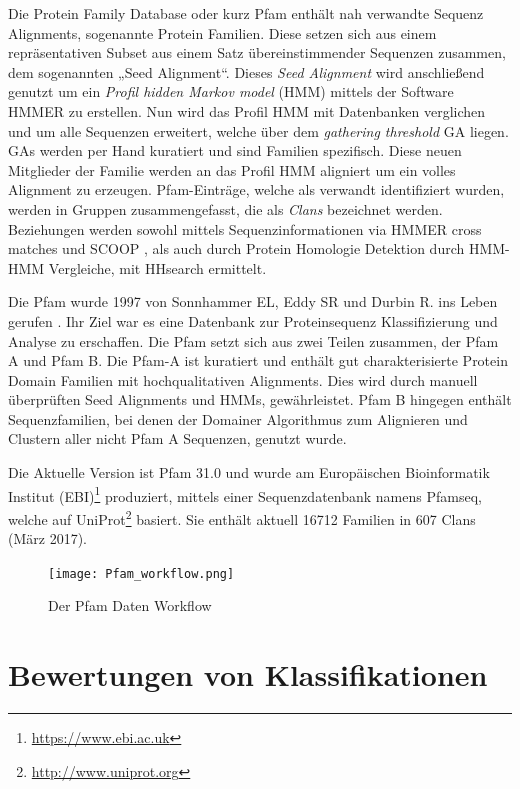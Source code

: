 Die Protein Family Database\cite{Finn.2014} oder kurz Pfam enthält nah verwandte Sequenz Alignments, sogenannte Protein Familien. Diese setzen sich aus einem repräsentativen Subset aus einem Satz übereinstimmender Sequenzen zusammen, dem sogenannten „Seed Alignment“. Dieses \emph{Seed Alignment} wird anschließend genutzt um ein \emph{Profil hidden Markov model} (HMM) \cite{Soding.2005} mittels der Software HMMER\cite{Mistry.2013} zu erstellen. Nun wird das Profil HMM mit Datenbanken verglichen und um alle Sequenzen erweitert, welche über dem \emph{gathering threshold} GA liegen. GAs werden per Hand kuratiert und sind Familien spezifisch. Diese neuen Mitglieder der Familie werden an das Profil HMM aligniert um ein volles Alignment zu erzeugen. Pfam-Einträge, welche als verwandt identifiziert wurden, werden in Gruppen zusammengefasst, die als \emph{Clans} bezeichnet werden. Beziehungen werden sowohl mittels Sequenzinformationen via HMMER cross matches und SCOOP \cite{Bateman.2007}, als auch durch Protein Homologie Detektion durch HMM-HMM Vergleiche, mit HHsearch \cite{Fidler.2016} ermittelt.

Die Pfam wurde 1997 von Sonnhammer EL, Eddy SR und Durbin R. ins Leben gerufen \cite{Sonnhammer.1997}. Ihr Ziel war es eine Datenbank zur Proteinsequenz Klassifizierung und Analyse zu erschaffen. Die Pfam setzt sich aus zwei Teilen zusammen, der Pfam A und Pfam B. Die Pfam-A ist kuratiert und enthält gut charakterisierte Protein Domain Familien mit hochqualitativen Alignments. Dies wird durch manuell überprüften Seed Alignments und HMMs, gewährleistet. Pfam B hingegen enthält Sequenzfamilien, bei denen der Domainer Algorithmus zum Alignieren und Clustern aller nicht Pfam A Sequenzen, genutzt wurde. 

Die Aktuelle Version ist Pfam 31.0 und wurde am Europäischen Bioinformatik Institut (EBI)\footnote{\url{https://www.ebi.ac.uk}} produziert, mittels einer Sequenzdatenbank namens Pfamseq, welche auf UniProt\footnote{\url{http://www.uniprot.org}} basiert. Sie enthält aktuell 16712 Familien in 607 Clans (März 2017).
\begin{figure}
\texttt{[image: Pfam\_workflow.png]}
\caption{Der Pfam Daten Workflow }
\label{fig:Pfam_workflow}
\end{figure}


\section{Bewertungen von Klassifikationen}

